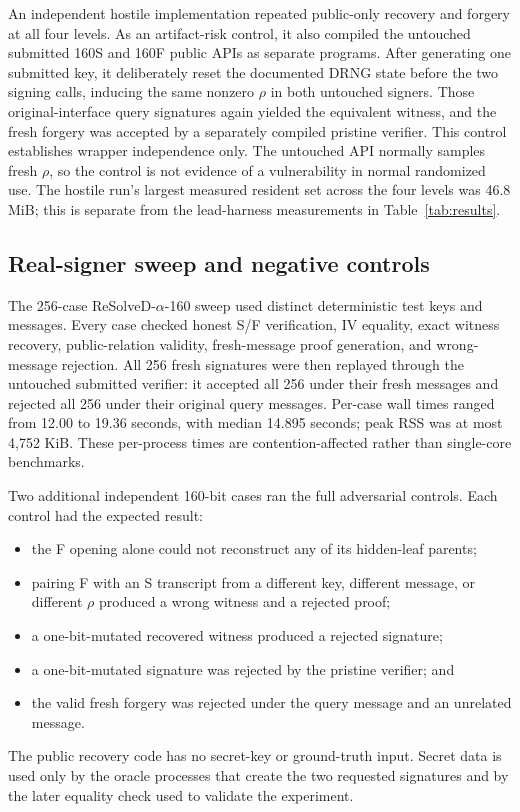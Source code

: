 \documentclass[11pt,a4paper]{article}
\begin{document}
An independent hostile implementation repeated public-only recovery and forgery
at all four levels.  As an artifact-risk control, it also compiled the untouched
submitted 160S and 160F public APIs as separate programs.  After generating one
submitted key, it deliberately reset the documented DRNG state before the two
signing calls, inducing the same nonzero $\rho$ in both untouched signers.
Those original-interface query signatures again yielded the equivalent witness,
and the fresh forgery was accepted by a separately compiled pristine verifier.
This control establishes wrapper independence only.  The untouched API normally
samples fresh $\rho$, so the control is not evidence of a vulnerability in
normal randomized use.  The hostile run's largest measured resident set across
the four levels was 46.8 MiB; this is separate from the lead-harness
measurements in Table~\ref{tab:results}.

\subsection{Real-signer sweep and negative controls}

The 256-case ReSolveD-$\alpha$-160 sweep used distinct deterministic test keys
and messages.  Every case checked honest S/F verification, IV equality, exact
witness recovery, public-relation validity, fresh-message proof generation, and
wrong-message rejection.  All 256 fresh signatures were then replayed through
the untouched submitted verifier: it accepted all 256 under their fresh
messages and rejected all 256 under their original query messages.  Per-case
wall times ranged from 12.00 to 19.36 seconds, with median 14.895 seconds; peak
RSS was at most 4,752 KiB.  These per-process times are contention-affected
rather than single-core benchmarks.

Two additional independent 160-bit cases ran the full adversarial controls.
Each control had the expected result:
\begin{itemize}[leftmargin=*,itemsep=2pt]
  \item the F opening alone could not reconstruct any of its hidden-leaf
        parents;
  \item pairing F with an S transcript from a different key, different message,
        or different $\rho$ produced a wrong witness and a rejected proof;
  \item a one-bit-mutated recovered witness produced a rejected signature;
  \item a one-bit-mutated signature was rejected by the pristine verifier; and
  \item the valid fresh forgery was rejected under the query message and an
        unrelated message.
\end{itemize}
The public recovery code has no secret-key or ground-truth input.  Secret data
is used only by the oracle processes that create the two requested signatures
and by the later equality check used to validate the experiment.
\end{document}
